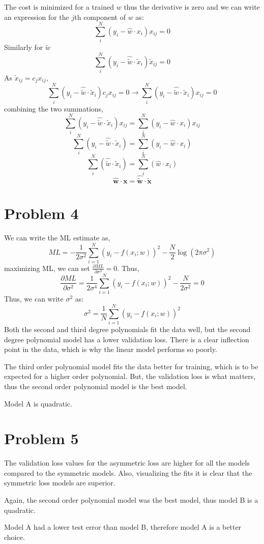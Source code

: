 \documentclass[]{article}
\begin{document}
The cost is minimized for a trained $w$ thus the derivative is zero and we can write an expression for the $j$th component of $w$ as:
\[
\sum_{i}^{N}(y_i-\hat{w}\cdot x_i)x_{ij} = 0
\]
Similarly for $\tilde{w}$
\[
\sum_{i}^{N}(y_i-\hat{\tilde{w}}\cdot \tilde{x}_i)\tilde{x}_{ij} = 0
\]
As $\tilde{x}_{ij}=c_jx_{ij}$, 
\[
\sum_{i}^{N}(y_i-\hat{\tilde{w}}\cdot \tilde{x}_i)c_jx_{ij} = 0 \rightarrow \sum_{i}^{N}(y_i-\hat{\tilde{w}}\cdot \tilde{x}_i)x_{ij} = 0
\]
combining the two summations,
\[
\sum_{i}^{N}(y_i-\hat{\tilde{w}}\cdot \tilde{x}_i)x_{ij} = \sum_{i}^{N}(y_i-\hat{w}\cdot x_i)x_{ij}
\]
\[
\sum_{i}^{N}(y_i-\hat{\tilde{w}}\cdot \tilde{x}_i) = \sum_{i}^{N}(y_i-\hat{w}\cdot x_i)
\]
\[
\sum_{i}^{N}(\hat{\tilde{w}}\cdot \tilde{x}_i) = \sum_{i}^{N}(\hat{w}\cdot x_i)
\]
\[
\hat{\textbf{w}}\cdot\textbf{x} = \hat{\tilde{\textbf{w}}}\cdot\tilde{\textbf{x}}
\]
\section*{Problem 4}
We can write the ML estimate as,
\[
ML = -\frac{1}{2\sigma^2}\sum_{i=1}^{N}(y_i-f(x_i;w))^2-\frac{N}{2}\log(2\pi\sigma^2)
\]
maximizing ML, we can set $\frac{\partial ML}{\partial\sigma^2}=0$. Thus,
\[
\frac{\partial ML}{\partial\sigma^2} = \frac{1}{2\sigma^4}\sum_{i=1}^{N}(y_i-f(x_i;w))^2 -\frac{N}{2\sigma^2} = 0
\]
Thus, we can write $\sigma^2$ as:
\[
\sigma^2 = \frac{1}{N}\sum_{i=1}^{N}(y_i-f(x_i;w))^2
\]
Both the second and third degree polynomials fit the data well, but the second degree polynomial model has a lower validation loss. There is a clear inflection point in the data, which is why the linear model performs so poorly. 

The third order polynomial model fits the data better for training, which is to be expected for a higher order polynomial. But, the validation loss is what matters, thus the second order polynomial model is the best model.

Model A is quadratic.
\section*{Problem 5}
The validation loss values for the asymmetric loss are higher for all the models compared to the symmetric models. Also, visualizing the fits it is clear that the symmetric loss models are superior.

Again, the second order polynomial model was the best model, thus model B is a quadratic. 

Model A had a lower test error than model B, therefore model A is a better choice.
\end{document}
